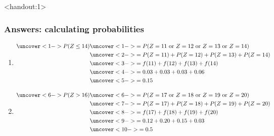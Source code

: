 \documentclass[handout]{beamer}\usepackage{graphicx, color}
\newcommand{\answers}{1}
\numberwithin{equation}{section}
\begin{document}
\begin{frame}<handout:\answers>
\frametitle{Answers: calculating probabilities} \scriptsize
\begin{enumerate}[1. ]
\item \begin{align*}
\uncover<1->{P(Z \le 14)} & \uncover<1->{= P(Z = 11 \text{ or } Z = 12 \text{ or } Z = 13 \text{ or } Z = 14)} \\
& \uncover<2->{= P(Z = 11) + P(Z = 12) + P(Z = 13) + P(Z = 14)} \\
& \uncover<3->{= f(11) + f(12) + f(13) + f(14)} \\
& \uncover<4->{= 0.03 + 0.03 + 0.03 + 0.06} \\
& \uncover<5->{= 0.15 }
\end{align*}
\item 
\begin{align*}
\uncover<6->{P(Z > 16)} & \uncover<6->{= P(Z = 17 \text{ or } Z = 18 \text{ or } Z = 19 \text{ or } Z = 20)} \\
&\uncover<7->{ = P(Z = 17) + P(Z = 18) + P(Z = 19) + P(Z =20)} \\
& \uncover<8->{= f(17) + f(18) + f(19) + f(20)} \\
& \uncover<9->{= 0.12 + 0.20 + 0.15 + 0.03} \\
& \uncover<10->{= 0.5}
\end{align*}
\end{enumerate}
\end{frame}
\end{document}
